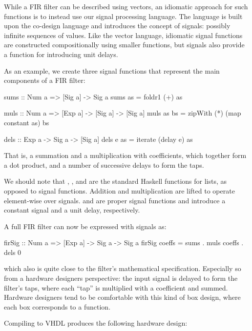 \documentclass[../paper.tex]{subfiles}
\begin{document}
While a FIR filter can be described using vectors, an idiomatic approach for such functions is to instead use our signal processing language. The language is built upon the co-design language and introduces the concept of signals: possibly infinite sequences of values. Like the vector language, idiomatic signal functions are constructed compositionally using smaller functions, but signals also provide a function for introducing unit delays.

As an example, we create three signal functions that represent the main components of a FIR filter:

\begin{code}
sums :: Num a => [Sig a] -> Sig a
sums as = foldr1 (+) as

muls :: Num a => [Exp a] -> [Sig a] -> [Sig a]
muls as bs = zipWith (*) (map constant as) bs

dels :: Exp a -> Sig a -> [Sig a]
dels e as = iterate (delay e) as
\end{code}

\noindent That is, a summation and a multiplication with coefficients, which together form a dot product, and a number of successive delays to form the taps.

We should note that , ,  and  are the standard Haskell functions for lists, as opposed to signal functions. Addition and multiplication are lifted to operate element-wise over signals.  and  are proper signal functions and introduce a constant signal and a unit delay, respectively.

A full FIR filter can now be expressed with signals as:

\begin{code}
firSig :: Num a => [Exp a] -> Sig a -> Sig a
firSig coeffs = sums . muls coeffs . dels 0
\end{code}

\noindent which also is quite close to the filter's mathematical specification. Especially so from a hardware designers perspective: the input signal is delayed to form the filter's taps, where each ``tap'' is multiplied with a coefficient and summed. Hardware designers tend to be comfortable with this kind of box design, where each box corresponds to a function.

Compiling  to VHDL produces the following hardware design:
\end{document}
